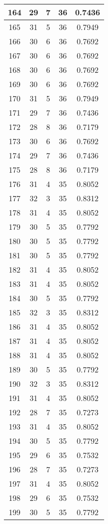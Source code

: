 \documentclass[letterpaper, 12pt]{article}
\begin{document}
\begin{longtable}{|c|c|c|c|c|}
\hline
164 & 29 & 7 & 36 & 0.7436 \\
\hline
165 & 31 & 5 & 36 & 0.7949 \\
\hline
166 & 30 & 6 & 36 & 0.7692 \\
\hline
167 & 30 & 6 & 36 & 0.7692 \\
\hline
168 & 30 & 6 & 36 & 0.7692 \\
\hline
169 & 30 & 6 & 36 & 0.7692 \\
\hline
170 & 31 & 5 & 36 & 0.7949 \\
\hline
171 & 29 & 7 & 36 & 0.7436 \\
\hline
172 & 28 & 8 & 36 & 0.7179 \\
\hline
173 & 30 & 6 & 36 & 0.7692 \\
\hline
174 & 29 & 7 & 36 & 0.7436 \\
\hline
175 & 28 & 8 & 36 & 0.7179 \\
\hline
176 & 31 & 4 & 35 & 0.8052 \\
\hline
177 & 32 & 3 & 35 & 0.8312 \\
\hline
178 & 31 & 4 & 35 & 0.8052 \\
\hline
179 & 30 & 5 & 35 & 0.7792 \\
\hline
180 & 30 & 5 & 35 & 0.7792 \\
\hline
181 & 30 & 5 & 35 & 0.7792 \\
\hline
182 & 31 & 4 & 35 & 0.8052 \\
\hline
183 & 31 & 4 & 35 & 0.8052 \\
\hline
184 & 30 & 5 & 35 & 0.7792 \\
\hline
185 & 32 & 3 & 35 & 0.8312 \\
\hline
186 & 31 & 4 & 35 & 0.8052 \\
\hline
187 & 31 & 4 & 35 & 0.8052 \\
\hline
188 & 31 & 4 & 35 & 0.8052 \\
\hline
189 & 30 & 5 & 35 & 0.7792 \\
\hline
190 & 32 & 3 & 35 & 0.8312 \\
\hline
191 & 31 & 4 & 35 & 0.8052 \\
\hline
192 & 28 & 7 & 35 & 0.7273 \\
\hline
193 & 31 & 4 & 35 & 0.8052 \\
\hline
194 & 30 & 5 & 35 & 0.7792 \\
\hline
195 & 29 & 6 & 35 & 0.7532 \\
\hline
196 & 28 & 7 & 35 & 0.7273 \\
\hline
197 & 31 & 4 & 35 & 0.8052 \\
\hline
198 & 29 & 6 & 35 & 0.7532 \\
\hline
199 & 30 & 5 & 35 & 0.7792 \\
\hline
\end{longtable}
\end{document}
